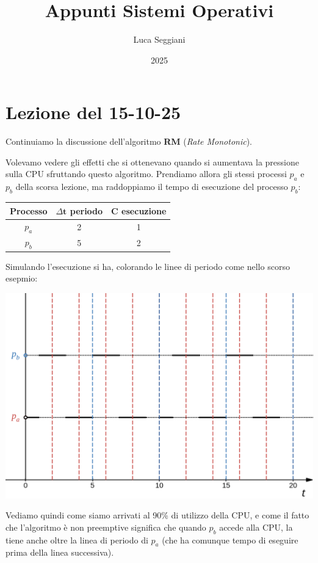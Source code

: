\documentclass[a4paper,11pt]{article}
\title{Appunti Sistemi Operativi}
\author{Luca Seggiani}
\date{2025}
\begin{document}
\section{Lezione del 15-10-25}

\thispagestyle{empty}
\pagestyle{fancy}

Continuiamo la discussione dell'algoritmo \textbf{RM} (\textit{Rate Monotonic}).

Volevamo vedere gli effetti che si ottenevano quando si aumentava la pressione sulla CPU sfruttando questo algoritmo.
Prendiamo allora gli stessi processi $p_a$ e $p_b$ della scorsa lezione, ma raddoppiamo il tempo di esecuzione del processo $p_b$:
\begin{table}[H]
	\center {}
	\begin{tabular} { c || c | c }
		\bfseries Processo & \bfseries $\Delta \mathbf{t}$ periodo & \bfseries $\mathbf{C}$ esecuzione \\
		\hline
		$p_a$ & 2 & 1 \\ 
		$p_b$ & 5 & 2
	\end{tabular}
\end{table}

\newpage

Simulando l'esecuzione si ha, colorando le linee di periodo come nello scorso esepmio: 
\begin{center}
	\includegraphics[scale=0.3]{../figures/rm_tight.png}
\end{center}

Vediamo quindi come siamo arrivati al 90\% di utilizzo della CPU, e come  il fatto che l'algoritmo è non preemptive significa che quando $p_b$ accede alla CPU, la tiene anche oltre la linea di periodo di $p_a$ (che ha comunque tempo di eseguire prima della linea successiva).
\end{document}
